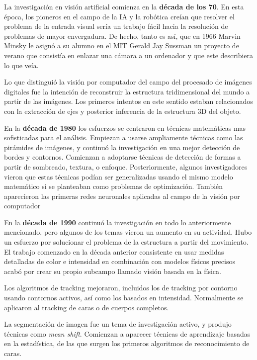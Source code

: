 La investigación en visión artificial comienza en la \textbf{década de los 70}. En esta época, los pioneros en el campo de la IA y la robótica creían que resolver el problema de la entrada visual sería un trabajo fácil hacia la resolución de problemas de mayor envergadura. De hecho, tanto es así, que en 1966 Marvin Minsky le asignó a su alumno en el MIT Gerald Jay Sussman un proyecto de verano que consistía en enlazar una cámara a un ordenador y que este describiera lo que veía.

Lo que distinguió la visión por computador del campo del procesado de imágenes digitales fue la intención de reconstruir la estructura tridimensional del mundo a partir de las imágenes. Los primeros intentos en este sentido estaban relacionados con la extracción de ejes y posterior inferencia de la estructura 3D del objeto.

En la \textbf{década de 1980} los esfuerzos se centraron en técnicas matemáticas mas sofisticadas para el análisis. Empiezan a usarse ampliamente técnicas como las pirámides de imágenes, y continuó la investigación en una mejor detección de bordes y contornos. Comienzan a adoptarse técnicas de detección de formas a partir de sombreado, textura, o enfoque. Posteriormente, algunos investigadores vieron que estas técnicas podían ser generalizadas usando el mismo modelo matemático si se planteaban como problemas de optimización. También aparecieron las primeras redes neuronales aplicadas al campo de la visión por computador

En la \textbf{década de 1990} continuó la investigación en todo lo anteriormente mencionado, pero algunos de los temas vieron un aumento en su actividad. Hubo un esfuerzo por solucionar el problema de la estructura a partir del movimiento. El trabajo comenzado en la década anterior consistente en usar medidas detalladas de color e intensidad en combinación con modelos físicos precisos acabó por crear su propio subcampo llamado visión basada en la física.

Los algoritmos de tracking mejoraron, incluidos los de tracking por contorno usando contornos activos, así como los basados en intensidad. Normalmente se aplicaron al tracking de caras o de cuerpos completos.

La segmentación de imagen fue un tema de investigación activo, y produjo técnicas como \textit{mean shift}. Comienzan a aparecer técnicas de aprendizaje basadas en la estadística, de las que surgen los primeros algoritmos de reconocimiento de caras.

